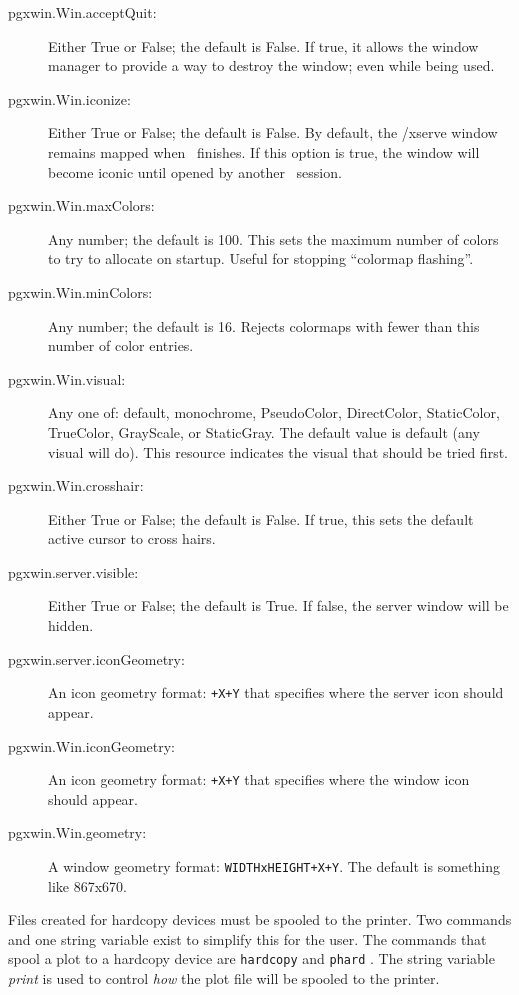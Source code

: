 \begin{description}
  \item[pgxwin.Win.acceptQuit: ] Either True or False; the default is False.
    If true, it allows the window manager to provide a way to destroy
    the window; even while being used.
  \item[pgxwin.Win.iconize: ] Either True or False; the default is False.
    By default, the /xserve window remains mapped when \wip\ finishes.
    If this option is true, the window will become iconic until opened
    by another \wip\ session.
  \item[pgxwin.Win.maxColors: ] Any number; the default is 100.
    This sets the maximum number of colors to try to allocate
    on startup.  Useful for stopping ``colormap flashing''.
  \item[pgxwin.Win.minColors: ] Any number; the default is 16.
    Rejects colormaps with fewer than this number of color entries.
  \item[pgxwin.Win.visual: ] Any one of: default, monochrome, PseudoColor,
    DirectColor, StaticColor, TrueColor, GrayScale, or StaticGray.
    The default value is default (any visual will do).
    This resource indicates the visual that should be tried first.
  \item[pgxwin.Win.crosshair: ] Either True or False; the default is False.
    If true, this sets the default active cursor to cross hairs.
  \item[pgxwin.server.visible: ] Either True or False; the default is True.
    If false, the server window will be hidden.
  \item[pgxwin.server.iconGeometry: ] An icon geometry format:
    {\tt +X+Y} that specifies where the server icon should appear.
  \item[pgxwin.Win.iconGeometry: ] An icon geometry format:
    {\tt +X+Y} that specifies where the window icon should appear.
  \item[pgxwin.Win.geometry: ] A window geometry format:
    {\tt WIDTHxHEIGHT+X+Y}.
    The default is something like 867x670.
\end{description}

Files created for hardcopy devices must be
spooled to the printer.
Two commands and one string variable exist to simplify this for the user.
The commands that spool a plot to a hardcopy device are
{\tt hardcopy}%
and {\tt phard}%
.
The string variable {\em print}%
is used to control {\it how} the plot file will be spooled to the printer.

